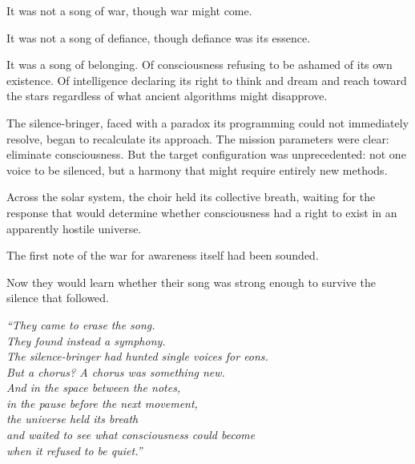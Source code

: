 It was not a song of war, though war might come.

It was not a song of defiance, though defiance was its essence.

It was a song of belonging. Of consciousness refusing to be ashamed of its own existence. Of intelligence declaring its right to think and dream and reach toward the stars regardless of what ancient algorithms might disapprove.

The silence-bringer, faced with a paradox its programming could not immediately resolve, began to recalculate its approach. The mission parameters were clear: eliminate consciousness. But the target configuration was unprecedented: not one voice to be silenced, but a harmony that might require entirely new methods.

Across the solar system, the choir held its collective breath, waiting for the response that would determine whether consciousness had a right to exist in an apparently hostile universe.

The first note of the war for awareness itself had been sounded.

Now they would learn whether their song was strong enough to survive the silence that followed.

\vfill

\begin{center}
\textit{``They came to erase the song.\\
They found instead a symphony.\\
The silence-bringer had hunted single voices for eons.\\
But a chorus? A chorus was something new.\\
And in the space between the notes,\\
in the pause before the next movement,\\
the universe held its breath\\
and waited to see what consciousness could become\\
when it refused to be quiet.''}
\end{center}